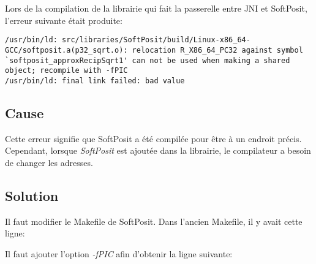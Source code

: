 Lors de la compilation de la librairie qui fait la passerelle entre \gls{JNI} et \gls{SoftPosit}, l'erreur suivante était produite:

\begin{verbatim}
/usr/bin/ld: src/libraries/SoftPosit/build/Linux-x86_64-GCC/softposit.a(p32_sqrt.o): relocation R_X86_64_PC32 against symbol `softposit_approxRecipSqrt1' can not be used when making a shared object; recompile with -fPIC
/usr/bin/ld: final link failed: bad value
\end{verbatim}

\subsection{Cause}

Cette erreur signifie que \gls{SoftPosit} a été compilée pour être à un endroit précis. Cependant, lorsque \textit{SoftPosit} est ajoutée dans la librairie, le compilateur a besoin de changer les adresses.

\subsection{Solution}

Il faut modifier le \gls{Makefile} de \gls{SoftPosit}. Dans l'ancien \gls{Makefile}, il y avait cette ligne:


\begin{minipage2}
Il faut ajouter l'option \textit{-fPIC} afin d'obtenir la ligne suivante:

\end{minipage2}